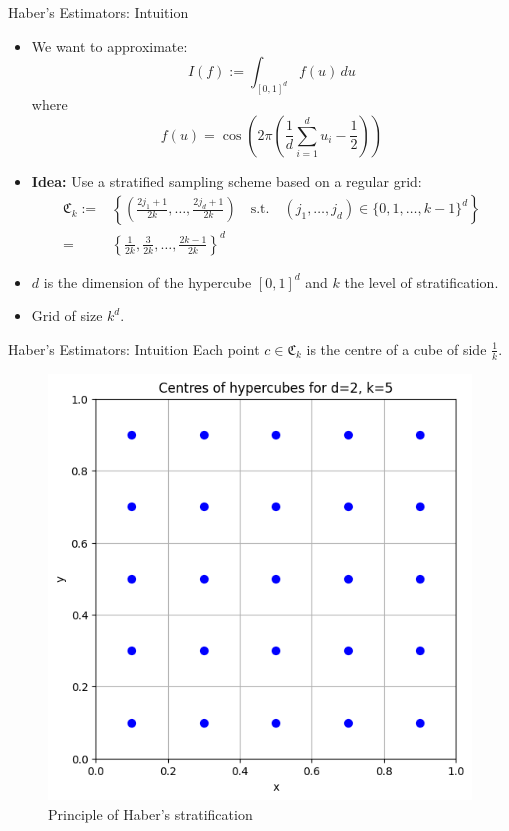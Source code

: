 \documentclass[aspectratio=169,xcolor=dvipsnames]{beamer}
\begin{document}
    \begin{frame}{Haber's Estimators: Intuition}
        \begin{itemize}
            \item<1-> We want to approximate:
            \[
            I(f) := \int_{[0,1]^d} f(u) \, du
            \]
            where \[
            f(u) = \cos\left(2\pi \left(\frac{1}{d} \sum_{i=1}^{d} u_i - \frac{1}{2}\right)\right)
            \]
            \item<2-> \textbf{Idea:} Use a stratified sampling scheme based on a regular grid:
            $$\begin{aligned} \mathfrak{C}_k := &\left\{\left(\frac{2j_1 + 1}{2k}, \dots, \frac{2j_d + 1}{2k}\right) \quad \text{s.t.} \quad (j_1, \dots, j_d) \in \{0, 1, \dots, k - 1\}^d\right\} \\ = &\left\{\frac{1}{2k}, \frac{3}{2k}, \dots, \frac{2k - 1}{2k}\right\}^d \end{aligned}$$
            \item<3-> $d$ is the dimension of the hypercube $[0,1]^d$ and $k$ the level of stratification.
            \item<4-> Grid of size $k^d$.  
        \end{itemize}


    
            
    \end{frame}

    \begin{frame}{Haber's Estimators: Intuition}
        Each point \( c \in \mathfrak{C}_k \) is the centre of a cube of side \( \frac{1}{k} \).  

        \begin{figure}
            \centering
            \includegraphics[width=0.4\linewidth]{points3.png}
            \caption{Principle of Haber's stratification}
            \label{fig:3}
        \end{figure}
    \end{frame}
\end{document}
